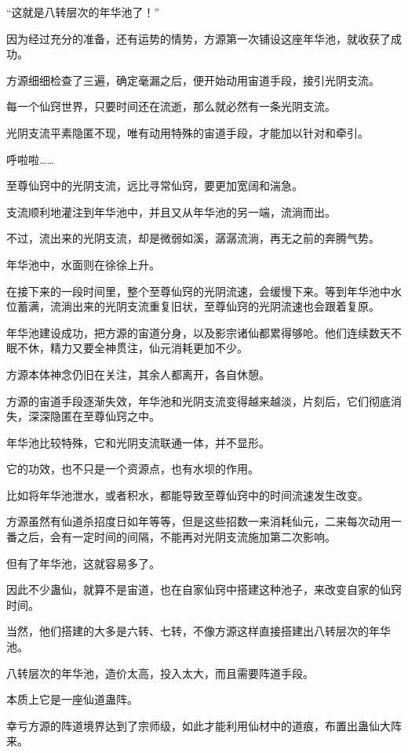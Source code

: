 \begin{this_body}
“这就是八转层次的年华池了！”

因为经过充分的准备，还有运势的情势，方源第一次铺设这座年华池，就收获了成功。

方源细细检查了三遍，确定毫漏之后，便开始动用宙道手段，接引光阴支流。

每一个仙窍世界，只要时间还在流逝，那么就必然有一条光阴支流。

光阴支流平素隐匿不现，唯有动用特殊的宙道手段，才能加以针对和牵引。

呼啦啦……

至尊仙窍中的光阴支流，远比寻常仙窍，要更加宽阔和湍急。

支流顺利地灌注到年华池中，并且又从年华池的另一端，流淌而出。

不过，流出来的光阴支流，却是微弱如溪，潺潺流淌，再无之前的奔腾气势。

年华池中，水面则在徐徐上升。

在接下来的一段时间里，整个至尊仙窍的光阴流速，会缓慢下来。等到年华池中水位蓄满，流淌出来的光阴支流重复旧状，至尊仙窍的光阴流速也会跟着复原。

年华池建设成功，把方源的宙道分身，以及影宗诸仙都累得够呛。他们连续数天不眠不休，精力又要全神贯注，仙元消耗更加不少。

方源本体神念仍旧在关注，其余人都离开，各自休憩。

方源的宙道手段逐渐失效，年华池和光阴支流变得越来越淡，片刻后，它们彻底消失，深深隐匿在至尊仙窍之中。

年华池比较特殊，它和光阴支流联通一体，并不显形。

它的功效，也不只是一个资源点，也有水坝的作用。

比如将年华池泄水，或者积水，都能导致至尊仙窍中的时间流速发生改变。

方源虽然有仙道杀招度日如年等等，但是这些招数一来消耗仙元，二来每次动用一番之后，会有一定时间的间隔，不能再对光阴支流施加第二次影响。

但有了年华池，这就容易多了。

因此不少蛊仙，就算不是宙道，也在自家仙窍中搭建这种池子，来改变自家的仙窍时间。

当然，他们搭建的大多是六转、七转，不像方源这样直接搭建出八转层次的年华池。

八转层次的年华池，造价太高，投入太大，而且需要阵道手段。

本质上它是一座仙道蛊阵。

幸亏方源的阵道境界达到了宗师级，如此才能利用仙材中的道痕，布置出蛊仙大阵来。


\end{this_body}
